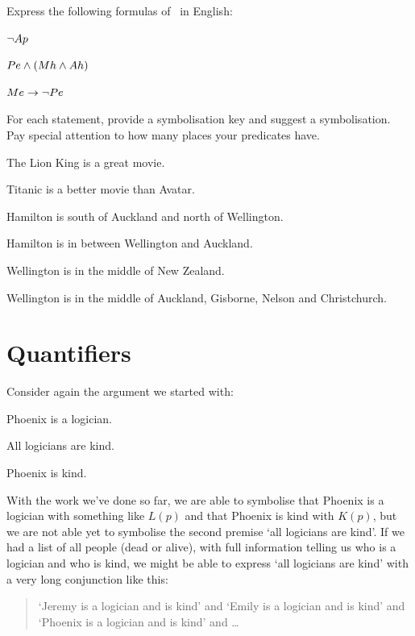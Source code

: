 \documentclass[PHIL101-Textbook.tex]{subfiles}
\begin{document}
\noindent\problempart
\label{pr.pl.symbol2}

Express the following formulas of \pl\ in English: 
\begin{earg}
\item $\neg \mathord{A}{p}$
\item $\mathord{P}{e} \land (\mathord{M}{h} \land \mathord{A}{h})$
\item $\mathord{M}{e} \rightarrow \neg \mathord{P}{e}$
\end{earg}

\noindent\problempart
\label{pr.complex-predicates}

For each statement, provide a symbolisation key and suggest a symbolisation. Pay special attention to how many places your predicates have. 

\begin{earg}
\item The Lion King is a great movie.
\item Titanic is a better movie than Avatar.
\item Hamilton is south of Auckland and north of Wellington. 
\item Hamilton is in between Wellington and Auckland.
\item Wellington is in the middle of New Zealand.
\item Wellington is in the middle of Auckland, Gisborne, Nelson and Christchurch. 
  \end{earg}




\chapter{Quantifiers}


Consider again the argument we started with:

\begin{earg}
\label{willard3}
\item[]Phoenix is a logician.
\item[] All logicians are kind.
\item[\therefore] Phoenix is kind.
\end{earg}


With the work we've done so far, we are able to symbolise that Phoenix is a logician with something like $L(p)$ and that Phoenix is kind with $K(p)$, but we are not able yet to symbolise the second premise `all logicians are kind'.
If we had a list of all people (dead or alive), with full information telling us who is a logician and who is kind, we might be able to express `all logicians are kind' with a very long conjunction like this:
\begin{quote}`Jeremy is a logician and is kind' and `Emily is a logician and is kind' and `Phoenix is a logician and is kind' and \dots \end{quote}
\end{document}
